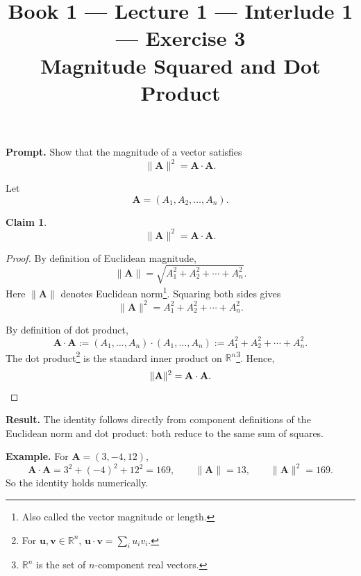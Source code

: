 \documentclass[11pt]{article}
\title{\textbf{Book 1 --- Lecture 1 --- Interlude 1 --- Exercise 3}\\[2mm]
\large Magnitude Squared and Dot Product}
\author{}
\date{}
\newtheorem*{claim}{Claim}
\newcommand{\promptbox}[1]{%
  \begingroup\setlength{\fboxsep}{10pt}\noindent
  \colorbox{blue!8}{\parbox{\dimexpr\linewidth-2\fboxsep\relax}{\textbf{Prompt. }#1}}
  \endgroup
}
\newcommand{\resultbox}[1]{%
  \begingroup\setlength{\fboxsep}{10pt}\noindent
  \colorbox{purple!8}{\parbox{\dimexpr\linewidth-2\fboxsep\relax}{\textbf{Result. }#1}}
  \endgroup
}
\newcommand{\examplebox}[1]{%
  \begingroup\setlength{\fboxsep}{10pt}\noindent
  \colorbox{green!8}{\parbox{\dimexpr\linewidth-2\fboxsep\relax}{\textbf{Example. }#1}}
  \endgroup
}
\begin{document}
\maketitle

\promptbox{Show that the magnitude of a vector satisfies
\[
\lVert\mathbf{A}\rVert^2 = \mathbf{A}\cdot\mathbf{A}.
\]}

Let
\[
\mathbf{A} = (A_1, A_2, \dots, A_n).
\]

\begin{claim}
\[
\lVert\mathbf{A}\rVert^2 = \mathbf{A}\cdot\mathbf{A}.
\]
\end{claim}

\begin{proof}
By definition of Euclidean magnitude,
\[
\lVert\mathbf{A}\rVert = \sqrt{A_1^2 + A_2^2 + \cdots + A_n^2}.
\]
Here \(\lVert\mathbf{A}\rVert\) denotes Euclidean norm\footnote{Also called the
vector magnitude or length.}.
Squaring both sides gives
\[
\lVert\mathbf{A}\rVert^2 = A_1^2 + A_2^2 + \cdots + A_n^2.
\]

By definition of dot product,
\[
\mathbf{A}\cdot\mathbf{A}
:= (A_1,\dots,A_n)\cdot(A_1,\dots,A_n)
:= A_1^2 + A_2^2 + \cdots + A_n^2.
\]
The dot product\footnote{For \(\mathbf{u},\mathbf{v}\in\mathbb{R}^n\),
\(\mathbf{u}\cdot\mathbf{v}=\sum_i u_i v_i\).} is the standard inner product on
\(\mathbb{R}^n\)\footnote{\(\mathbb{R}^n\) is the set of \(n\)-component real
vectors.}.
Hence,
\[
\lVert\mathbf{A}\rVert^2 = \mathbf{A}\cdot\mathbf{A}. \qedhere
\]
\end{proof}

\resultbox{The identity follows directly from component definitions of the
Euclidean norm and dot product: both reduce to the same sum of squares.}

\examplebox{For \(\mathbf{A}=(3,-4,12)\),
\[
\mathbf{A}\cdot\mathbf{A} = 3^2 + (-4)^2 + 12^2 = 169,\qquad
\lVert\mathbf{A}\rVert = 13,\qquad
\lVert\mathbf{A}\rVert^2 = 169.
\]
So the identity holds numerically.}
\end{document}
